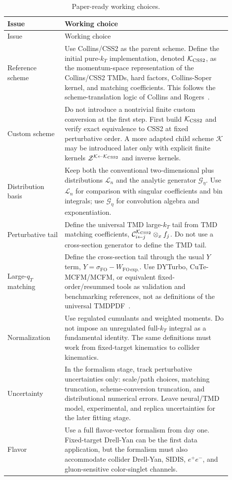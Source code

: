 \documentclass[11pt]{article}
\newcommand{\ox}{\otimes_x}
\newcommand{\FO}{\mathrm{FO}}
\newcommand{\Kscheme}{\mathcal K}
\newcommand{\KCSS}{\mathcal K_{\rm CSS2}}
\newcommand{\Zconv}{\mathcal Z}
\begin{document}
\begin{longtable}{p{0.23\linewidth} p{0.67\linewidth}}
\caption{Paper-ready working choices.}\label{tab:v09-choices}\\
\toprule
Issue & Working choice \\
\midrule
\endfirsthead
\toprule
Issue & Working choice \\
\midrule
\endhead
Reference scheme & Use Collins/CSS2 as the parent scheme. Define the initial pure-$k_T$ implementation, denoted $\KCSS$, as the momentum-space representation of the Collins/CSS2 TMDs, hard factors, Collins-Soper kernel, and matching coefficients. This follows the scheme-translation logic of Collins and Rogers~\cite{CollinsRogers2017}. \\
\addlinespace
Custom scheme & Do not introduce a nontrivial finite custom conversion at the first step. First build $\KCSS$ and verify exact equivalence to CSS2 at fixed perturbative order. A more adapted child scheme $\Kscheme$ may be introduced later only with explicit finite kernels $\Zconv^{\Kscheme\leftarrow \KCSS}$ and inverse kernels. \\
\addlinespace
Distribution basis & Keep both the conventional two-dimensional plus distributions $\mathcal L_n$ and the analytic generator $\mathcal G_\eta$. Use $\mathcal L_n$ for comparison with singular coefficients and bin integrals; use $\mathcal G_\eta$ for convolution algebra and exponentiation. \\
\addlinespace
Perturbative tail & Define the universal TMD large-$k_T$ tail from TMD matching coefficients, $\mathcal C_{i\leftarrow j}^{\KCSS}\ox f_j$. Do not use a cross-section generator to define the TMD tail. \\
\addlinespace
Large-$q_T$ matching & Define the cross-section tail through the usual $Y$ term, $Y=\sigma_{\FO}-W_{\FO\,\mathrm{exp.}}$. Use DYTurbo, CuTe-MCFM/MCFM, or equivalent fixed-order/resummed tools as validation and benchmarking references, not as definitions of the universal TMDPDF~\cite{CamardaEtAlDYTurbo2020,CamardaCieriFerrera2021,NeumannCampbell2023}. \\
\addlinespace
Normalization & Use regulated cumulants and weighted moments. Do not impose an unregulated full-$k_T$ integral as a fundamental identity. The same definitions must work from fixed-target kinematics to collider kinematics. \\
\addlinespace
Uncertainty & In the formalism stage, track perturbative uncertainties only: scale/path choices, matching truncation, scheme-conversion truncation, and distributional numerical errors. Leave neural/TMD model, experimental, and replica uncertainties for the later fitting stage. \\
\addlinespace
Flavor & Use a full flavor-vector formalism from day one. Fixed-target Drell-Yan can be the first data application, but the formalism must also accommodate collider Drell-Yan, SIDIS, $e^+e^-$, and gluon-sensitive color-singlet channels. \\
\bottomrule
\end{longtable}
\end{document}

